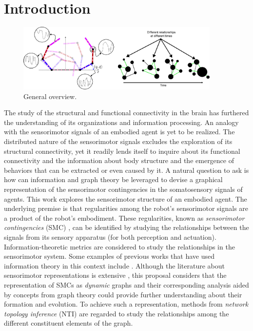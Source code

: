 \section{Introduction}\label{sec:intro}
\begin{figure}[!ht]
	\centering
	\includegraphics[width=0.9\textwidth]{dfc_concept_art.pdf}
	\caption{General overview.}
	\label{fig:general_overview}
\end{figure}
The study of the structural and functional connectivity in the brain has furthered the understanding of its organizations and information processing. An analogy with the sensorimotor signals of an embodied agent is yet to be realized. The distributed nature of the sensorimotor signals excludes the exploration of its structural connectivity, yet it readily lends itself to inquire about its functional connectivity and the information about body structure and the emergence of behaviors that can be extracted or even caused by it. 
A natural question to ask is how can information and graph theory be leveraged to devise a graphical representation of the sensorimotor contingencies in the somatosensory signals of agents. This work explores the sensorimotor structure of an embodied agent. The underlying premise is that regularities among the robot's sensorimotor signals are a product of the robot’s embodiment. These regularities, known as \emph{sensorimotor contingencies} (SMC) \cite{Jacquey2019Sensorimotorcontingenciesas}, can be identified by studying the relationships between the signals from its sensory apparatus (for both perception and actuation). Information-theoretic metrics are considered to study the relationships in the sensorimotor system. Some examples of previous works that have used information theory in this context include  \cite{Schmidt2013Bootstrappingperceptionusing,Lungarella2006Mappinginformationflow,Polani2009Modelsinformationprocessing,Bossomaier2016introductiontransferentropy,Olsson2006unknownsensorsactuators}. Although the literature about sensorimotor representations is extensive \cite{Nguyen2021Sensorimotorrepresentationlearning}, this proposal considers that the representation of SMCs as \emph{dynamic} graphs and their corresponding analysis aided by concepts from graph theory could provide further understanding about their formation and evolution. To achieve such a representation, methods from \emph{network topology inference} (NTI)\cite{Dong2019Learninggraphsdata} are regarded to study the relationships among the different constituent elements of the graph.

